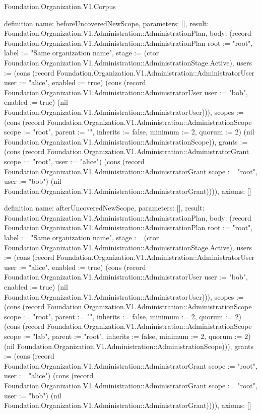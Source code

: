 \begin{lexlean}{Foundation.Organization.V1.Corpus}
\begin{semanticmodule}
definition{
  name: beforeUncoveredNewScope,
  parameters: [],
  result: Foundation.Organization.V1.Administration::AdministrationPlan,
  body: (record Foundation.Organization.V1.Administration::AdministrationPlan {root := "root", label := "Same organization name", stage := (ctor Foundation.Organization.V1.Administration::AdministrationStage.Active), users := (cons (record Foundation.Organization.V1.Administration::AdministratorUser {user := "alice", enabled := true}) (cons (record Foundation.Organization.V1.Administration::AdministratorUser {user := "bob", enabled := true}) (nil Foundation.Organization.V1.Administration::AdministratorUser))), scopes := (cons (record Foundation.Organization.V1.Administration::AdministrationScope {scope := "root", parent := "", inherits := false, minimum := 2, quorum := 2}) (nil Foundation.Organization.V1.Administration::AdministrationScope)), grants := (cons (record Foundation.Organization.V1.Administration::AdministratorGrant {scope := "root", user := "alice"}) (cons (record Foundation.Organization.V1.Administration::AdministratorGrant {scope := "root", user := "bob"}) (nil Foundation.Organization.V1.Administration::AdministratorGrant)))}),
  axioms: []
}

definition{
  name: afterUncoveredNewScope,
  parameters: [],
  result: Foundation.Organization.V1.Administration::AdministrationPlan,
  body: (record Foundation.Organization.V1.Administration::AdministrationPlan {root := "root", label := "Same organization name", stage := (ctor Foundation.Organization.V1.Administration::AdministrationStage.Active), users := (cons (record Foundation.Organization.V1.Administration::AdministratorUser {user := "alice", enabled := true}) (cons (record Foundation.Organization.V1.Administration::AdministratorUser {user := "bob", enabled := true}) (nil Foundation.Organization.V1.Administration::AdministratorUser))), scopes := (cons (record Foundation.Organization.V1.Administration::AdministrationScope {scope := "root", parent := "", inherits := false, minimum := 2, quorum := 2}) (cons (record Foundation.Organization.V1.Administration::AdministrationScope {scope := "lab", parent := "root", inherits := false, minimum := 2, quorum := 2}) (nil Foundation.Organization.V1.Administration::AdministrationScope))), grants := (cons (record Foundation.Organization.V1.Administration::AdministratorGrant {scope := "root", user := "alice"}) (cons (record Foundation.Organization.V1.Administration::AdministratorGrant {scope := "root", user := "bob"}) (nil Foundation.Organization.V1.Administration::AdministratorGrant)))}),
  axioms: []
}


\end{semanticmodule}
\end{lexlean}
